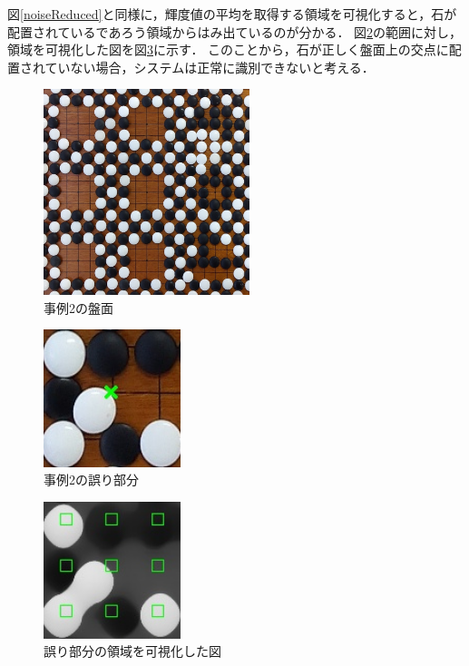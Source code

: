 \documentclass[openright]{nitocs}
\numberwithin{equation}{section}
\begin{document}
                図\ref{noiseReduced}と同様に，輝度値の平均を取得する領域を可視化すると，石が配置されているであろう領域からはみ出ているのが分かる．
                図\ref{ex2_error}の範囲に対し，領域を可視化した図を図\ref{ex2_error_area}に示す．
                このことから，石が正しく盤面上の交点に配置されていない場合，システムは正常に識別できないと考える．
                \begin{figure}[tb] %
                    \begin{center}
                    \includegraphics[width=60mm,height=60mm]{DSC_0099/boardImg.jpg} 
                    \caption{事例2の盤面}
                    \label{ex2}
                    \end{center}
                \end{figure}

                \begin{figure}[tb] %
                    \begin{center}
                    \includegraphics[width=40mm,height=40mm]{DSC_0099/TRIM_resultCompare.jpg} 
                    \caption{事例2の誤り部分}
                    \label{ex2_error}
                    \end{center}
                \end{figure}

                \begin{figure}[tb] %
                    \begin{center}
                    \includegraphics[width=40mm,height=40mm]{DSC_0099/TRIM_boardWithAreaImg.jpg} 
                    \caption{誤り部分の領域を可視化した図}
                    \label{ex2_error_area}
                    \end{center}
                \end{figure}
\end{document}
